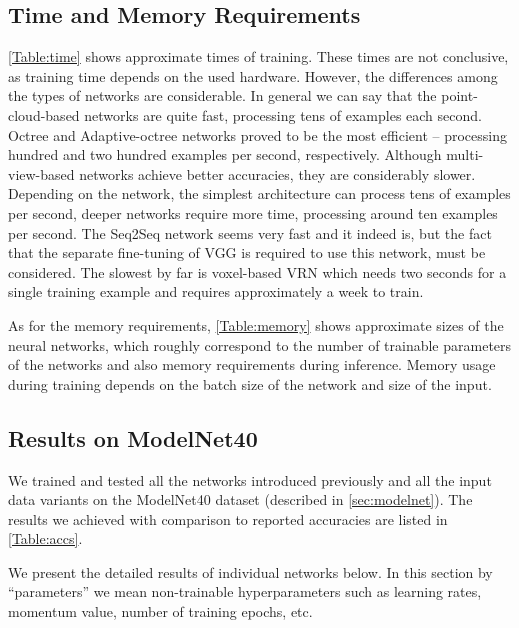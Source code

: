 \subsection{Time and Memory Requirements}
\autoref{Table:time} shows approximate times of training. These times are not conclusive, as training time depends on the used hardware. However, the differences among the types of networks are considerable. In general we can say that the point-cloud-based networks are quite fast, processing tens of examples each second. Octree and Adaptive-octree networks proved to be the most efficient -- processing hundred and two hundred examples per second, respectively. Although multi-view-based networks achieve better accuracies, they are considerably slower. Depending on the network, the simplest architecture can process tens of examples per second, deeper networks require more time, processing around ten examples per second. The Seq2Seq network seems very fast and it indeed is, but the fact that the separate fine-tuning of VGG is required to use this network, must be considered. The slowest by far is voxel-based VRN which needs two seconds for a single training example and requires approximately a week to train. \par


As for the memory requirements, \autoref{Table:memory} shows approximate sizes of the neural networks, which roughly correspond to the number of trainable parameters of the networks and also memory requirements during inference. Memory usage during training depends on the batch size of the network and size of the input.


\subsection{Results on ModelNet40}
We trained and tested all the networks introduced previously and all the input data variants on the ModelNet40 dataset (described in \autoref{sec:modelnet}). The results we achieved with comparison to reported accuracies are listed in \autoref{Table:accs}. 

We present the detailed results of individual networks below. In this section by “parameters” we mean non-trainable hyperparameters such as learning rates, momentum value, number of training epochs, etc.

\def\myitem #1#2{
	\item { \textbf{#1} \par #2
	}
}

